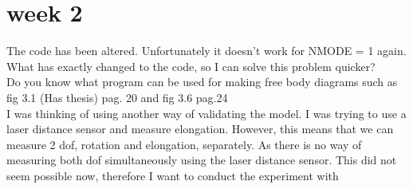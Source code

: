 \section{week 2}


The code has been altered. Unfortunately it doesn't work for NMODE = 1 again. What has exactly changed to the code, so I can solve this problem quicker? \\



Do you know what program can be used for making free body diagrams such as fig 3.1 (Has thesis) pag. 20 and fig 3.6 pag.24\\


I was thinking of using another way of validating the model. I was trying to use a laser distance sensor and measure elongation. However, this means that we can measure 2 dof, rotation and elongation, separately. As there is no way of measuring both dof simultaneously using the laser distance sensor. This did not seem possible now, therefore I want to conduct the experiment with



